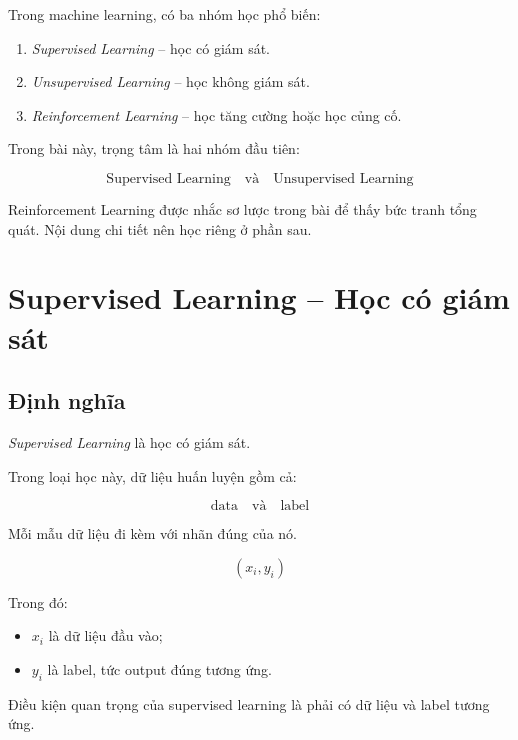 Trong machine learning, có ba nhóm học phổ biến:

\begin{enumerate}[label=\arabic*.]
    \item \textit{Supervised Learning} -- học có giám sát.
    \item \textit{Unsupervised Learning} -- học không giám sát.
    \item \textit{Reinforcement Learning} -- học tăng cường hoặc học củng cố.
\end{enumerate}

Trong bài này, trọng tâm là hai nhóm đầu tiên:

\[
    \text{Supervised Learning}
    \quad \text{và} \quad
    \text{Unsupervised Learning}
\]

\begin{luuy}
Reinforcement Learning được nhắc sơ lược trong bài để thấy bức tranh tổng quát. Nội dung chi tiết nên học riêng ở phần sau.
\end{luuy}

\section{Supervised Learning -- Học có giám sát}

\subsection{Định nghĩa}

\textit{Supervised Learning} là học có giám sát.

Trong loại học này, dữ liệu huấn luyện gồm cả:

\[
    \text{data}
    \quad \text{và} \quad
    \text{label}
\]

Mỗi mẫu dữ liệu đi kèm với nhãn đúng của nó.

\[
    (x_i, y_i)
\]

Trong đó:

\begin{itemize}
    \item $x_i$ là dữ liệu đầu vào;
    \item $y_i$ là label, tức output đúng tương ứng.
\end{itemize}

\begin{ghinho}
Điều kiện quan trọng của supervised learning là phải có dữ liệu và label tương ứng.
\end{ghinho}

